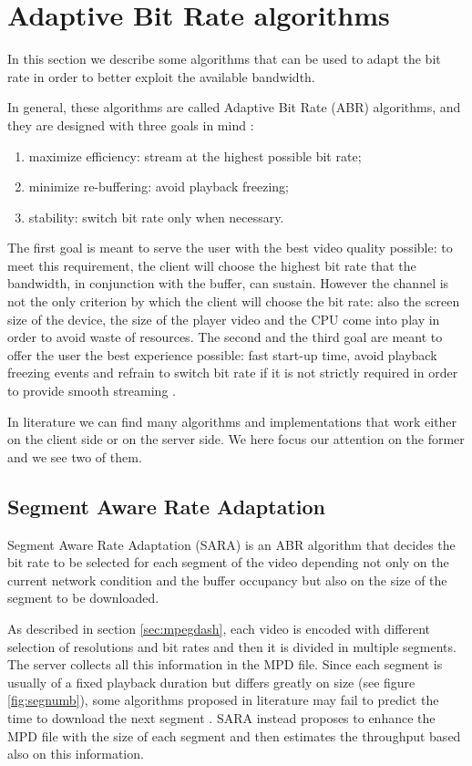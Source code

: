 \documentclass[openany]{book}
\begin{document}
\section{Adaptive Bit Rate algorithms}\label{sec:abr}
In this section we describe some algorithms that can be used to adapt the bit rate in order to better exploit the available bandwidth.

In general, these algorithms are called Adaptive Bit Rate (ABR) algorithms, and they are designed with three goals in mind \cite{ABR}:
\begin{enumerate}
\item maximize efficiency: stream at the highest possible bit rate;
\item minimize re-buffering: avoid playback freezing;
\item stability: switch bit rate only when necessary.
\end{enumerate}
The first goal is meant to serve the user with the best video quality possible: to meet this requirement, the client will choose the highest bit rate that the bandwidth, in conjunction with the buffer, can sustain. However the channel is not the only criterion by which the client will choose the bit rate: also the screen size of the device, the size of the player video and the CPU come into play in order to avoid waste of resources. The second and the third goal are meant to offer the user the best experience possible: fast start-up time, avoid playback freezing events and refrain to switch bit rate if it is not strictly required in order to provide smooth streaming \cite{QoEDASH}.

In literature we can find many algorithms and implementations that work either on the client side or on the server side. We here focus our attention on the former and we see two of them.

\subsection{Segment Aware Rate Adaptation}\label{subsec:sara}
Segment Aware Rate Adaptation (SARA) is an ABR algorithm that decides the bit rate to be selected for each segment of the video depending not only on the current network condition and the buffer occupancy but also on the size of the segment to be downloaded. 

As described in section \ref{sec:mpegdash}, each video is encoded with different selection of resolutions and bit rates and then it is divided in multiple segments. The server collects all this information in the MPD file. Since each segment is usually of a fixed playback duration but differs greatly on size (see figure \ref{fig:segnumb}), some algorithms proposed in literature may fail to predict the time to download the next segment \cite{SARA}. SARA instead proposes to enhance the MPD file with the size of each segment and then estimates the throughput based also on this information.
\end{document}
